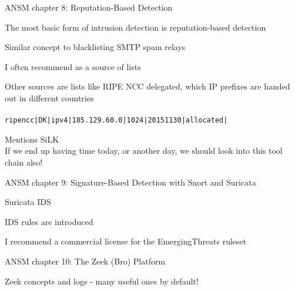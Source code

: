 \documentclass[Screen16to9,17pt]{foils}
\begin{document}


\begin{list1}
\item ANSM chapter 8: Reputation-Based Detection
\begin{list2}
\item The most basic form of intrusion detection is reputation-based detection
\item Similar concept to blacklisting SMTP spam relays
\item I often recommend  as a source of lists
\item Other sources are lists like RIPE NCC delegated, which IP prefixes are handed out in different countries\\
\\
\verb+ripencc|DK|ipv4|185.129.60.0|1024|20151130|allocated|+
\item Mentions SiLK \\
If we end up having time today, or another day, we should look into this tool chain also!
\end{list2}
\end{list1}





\begin{list1}
\item ANSM chapter 9: Signature-Based Detection with Snort and Suricata
\begin{list2}
\item Suricata IDS
\item IDS rules are introduced
\item I recommend a commercial license for the EmergingThreats ruleset
\end{list2}
\end{list1}



\begin{list1}
\item ANSM chapter 10: The Zeek (Bro) Platform
\begin{list2}
\item Zeek concepts and logs - many useful ones by default!
\end{list2}
\end{list1}
\end{document}
